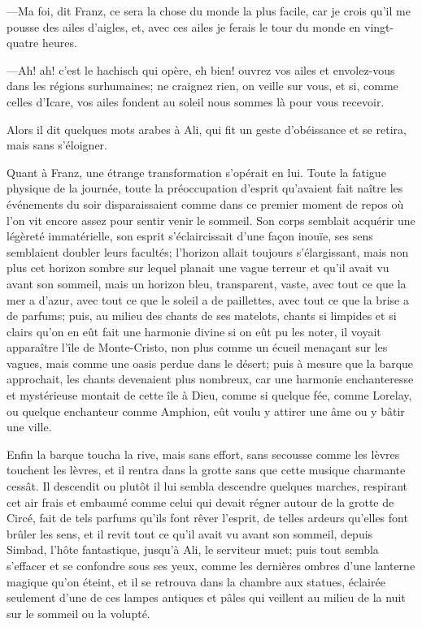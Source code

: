 —Ma foi, dit Franz, ce sera la chose du monde la plus facile, car je crois qu'il me pousse des ailes d'aigles, et, avec ces ailes je ferais le tour du monde en vingt-quatre heures.

—Ah! ah! c'est le hachisch qui opère, eh bien! ouvrez vos ailes et envolez-vous dans les régions surhumaines; ne craignez rien, on veille sur vous, et si, comme celles d'Icare, vos ailes fondent au soleil nous sommes là pour vous recevoir.

Alors il dit quelques mots arabes à Ali, qui fit un geste d'obéissance et se retira, mais sans s'éloigner.

Quant à Franz, une étrange transformation s'opérait en lui. Toute la fatigue physique de la journée, toute la préoccupation d'esprit qu'avaient fait naître les événements du soir disparaissaient comme dans ce premier moment de repos où l'on vit encore assez pour sentir venir le sommeil. Son corps semblait acquérir une légèreté immatérielle, son esprit s'éclaircissait d'une façon inouïe, ses sens semblaient doubler leurs facultés; l'horizon allait toujours s'élargissant, mais non plus cet horizon sombre sur lequel planait une vague terreur et qu'il avait vu avant son sommeil, mais un horizon bleu, transparent, vaste, avec tout ce que la mer a d'azur, avec tout ce que le soleil a de paillettes, avec tout ce que la brise a de parfums; puis, au milieu des chants de ses matelots, chants si limpides et si clairs qu'on en eût fait une harmonie divine si on eût pu les noter, il voyait apparaître l'île de Monte-Cristo, non plus comme un écueil menaçant sur les vagues, mais comme une oasis perdue dans le désert; puis à mesure que la barque approchait, les chants devenaient plus nombreux, car une harmonie enchanteresse et mystérieuse montait de cette île à Dieu, comme si quelque fée, comme Lorelay, ou quelque enchanteur comme Amphion, eût voulu y attirer une âme ou y bâtir une ville.

Enfin la barque toucha la rive, mais sans effort, sans secousse comme les lèvres touchent les lèvres, et il rentra dans la grotte sans que cette musique charmante cessât. Il descendit ou plutôt il lui sembla descendre quelques marches, respirant cet air frais et embaumé comme celui qui devait régner autour de la grotte de Circé, fait de tels parfums qu'ils font rêver l'esprit, de telles ardeurs qu'elles font brûler les sens, et il revit tout ce qu'il avait vu avant son sommeil, depuis Simbad, l'hôte fantastique, jusqu'à Ali, le serviteur muet; puis tout sembla s'effacer et se confondre sous ses yeux, comme les dernières ombres d'une lanterne magique qu'on éteint, et il se retrouva dans la chambre aux statues, éclairée seulement d'une de ces lampes antiques et pâles qui veillent au milieu de la nuit sur le sommeil ou la volupté.

